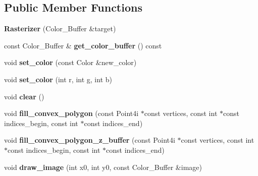 \subsection*{Public Member Functions}
\begin{DoxyCompactItemize}
\item 
\mbox{\label{class_project1__3_d_a_1_1_rasterizer_a0faf785b6487a4ff0b554a98d0d91518}} 
{\bfseries Rasterizer} (Color\+\_\+\+Buffer \&target)
\item 
\mbox{\label{class_project1__3_d_a_1_1_rasterizer_a7e57dff02ebd0889251dd26d88954028}} 
const Color\+\_\+\+Buffer \& {\bfseries get\+\_\+color\+\_\+buffer} () const
\item 
\mbox{\label{class_project1__3_d_a_1_1_rasterizer_aa7074b8adf8286189666349d2d26271e}} 
void {\bfseries set\+\_\+color} (const Color \&new\+\_\+color)
\item 
\mbox{\label{class_project1__3_d_a_1_1_rasterizer_ab5d0f4d1f102f4b9c660b76465d38174}} 
void {\bfseries set\+\_\+color} (int r, int g, int b)
\item 
\mbox{\label{class_project1__3_d_a_1_1_rasterizer_aa5c533f8421001836b982450fbcd203d}} 
void {\bfseries clear} ()
\item 
\mbox{\label{class_project1__3_d_a_1_1_rasterizer_a3cc2b329e25094fca9f898f1890d492b}} 
void {\bfseries fill\+\_\+convex\+\_\+polygon} (const Point4i $\ast$const vertices, const int $\ast$const indices\+\_\+begin, const int $\ast$const indices\+\_\+end)
\item 
\mbox{\label{class_project1__3_d_a_1_1_rasterizer_ae0c6fb85e7bcc2b4800ac10c3b80aa27}} 
void {\bfseries fill\+\_\+convex\+\_\+polygon\+\_\+z\+\_\+buffer} (const Point4i $\ast$const vertices, const int $\ast$const indices\+\_\+begin, const int $\ast$const indices\+\_\+end)
\item 
\mbox{\label{class_project1__3_d_a_1_1_rasterizer_a4bc33183f12014d38f65a019c1b3f568}} 
void {\bfseries draw\+\_\+image} (int x0, int y0, const Color\+\_\+\+Buffer \&image)
\end{DoxyCompactItemize}
